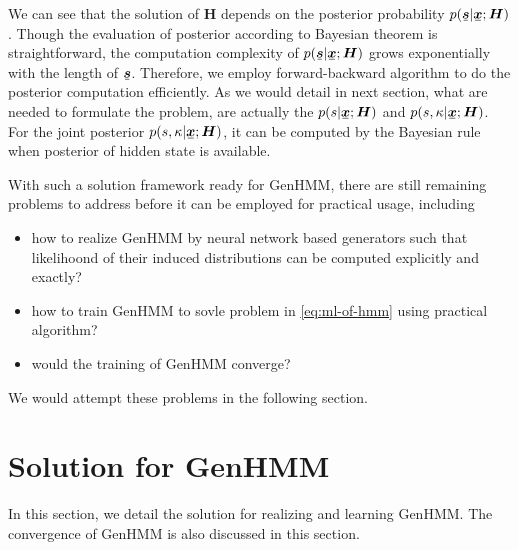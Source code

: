 \documentclass[letterpaper]{article} %
\newcommand{\ubar}[1]{\mkern2mu\underline{\mkern-2mu #1\mkern-2mu}\mkern2mu}
\newcommand{\ubm}[1]{\ubar{\bm{#1}}}
\begin{document}
We can see that the solution of $\bm{H}$ depends on the posterior probability $p(\ubm{s}| \ubm{x}; \bm{H})$. Though the evaluation of posterior according to Bayesian theorem is straightforward, the computation complexity of $p(\ubm{s}| \ubm{x}; \bm{H})$ grows exponentially with the length of $\ubm{s}$. Therefore, we employ forward-backward algorithm \cite{Bishop:2006:PRM:1162264} to do the posterior computation efficiently. As we would detail in next section, what are needed to formulate the problem, are actually the $p(s| \ubm{x}; \bm{H})$ and $p(s, \kappa| \ubm{x}; \bm{H})$. For the joint posterior $p(s, \kappa| \ubm{x}; \bm{H})$, it can be computed by the Bayesian rule when posterior of hidden state is available.


With such a solution framework ready for GenHMM, there are still remaining problems to address before it can be employed for practical usage, including
\begin{itemize}
\item how to realize GenHMM by neural network based generators such that likelihoond of their induced distributions can be computed explicitly and exactly?
\item how to train GenHMM to sovle problem in \eqref{eq:ml-of-hmm} using practical algorithm?
\item would the training of GenHMM converge?
\end{itemize}
We would attempt these problems in the following section.



\section{Solution for GenHMM}

In this section, we detail the solution for realizing and learning GenHMM. %
The convergence of GenHMM is also discussed in this section.
\end{document}
